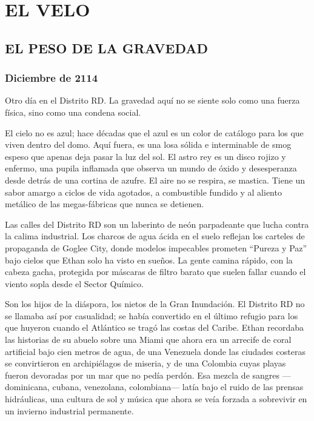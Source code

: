 \documentclass[11pt,twoside]{book}
\begin{document}
\part{EL VELO}

\chapter{EL PESO DE LA GRAVEDAD}

\section*{Diciembre de 2114}

Otro día en el Distrito RD. La gravedad aquí no se siente solo como una fuerza física, sino como una condena social.

El cielo no es azul; hace décadas que el azul es un color de catálogo para los que viven dentro del domo. Aquí fuera, es una losa sólida e interminable de smog espeso que apenas deja pasar la luz del sol. El astro rey es un disco rojizo y enfermo, una pupila inflamada que observa un mundo de óxido y desesperanza desde detrás de una cortina de azufre. El aire no se respira, se mastica. Tiene un sabor amargo a ciclos de vida agotados, a combustible fundido y al aliento metálico de las megas-fábricas que nunca se detienen.

Las calles del Distrito RD son un laberinto de neón parpadeante que lucha contra la calima industrial. Los charcos de agua ácida en el suelo reflejan los carteles de propaganda de Goglee City, donde modelos impecables prometen ``Pureza y Paz'' bajo cielos que Ethan solo ha visto en sueños. La gente camina rápido, con la cabeza gacha, protegida por máscaras de filtro barato que suelen fallar cuando el viento sopla desde el Sector Químico.

Son los hijos de la diáspora, los nietos de la Gran Inundación. El Distrito RD no se llamaba así por casualidad; se había convertido en el último refugio para los que huyeron cuando el Atlántico se tragó las costas del Caribe. Ethan recordaba las historias de su abuelo sobre una Miami que ahora era un arrecife de coral artificial bajo cien metros de agua, de una Venezuela donde las ciudades costeras se convirtieron en archipiélagos de miseria, y de una Colombia cuyas playas fueron devoradas por un mar que no pedía perdón. Esa mezcla de sangres ---dominicana, cubana, venezolana, colombiana--- latía bajo el ruido de las prensas hidráulicas, una cultura de sol y música que ahora se veía forzada a sobrevivir en un invierno industrial permanente.
\end{document}
